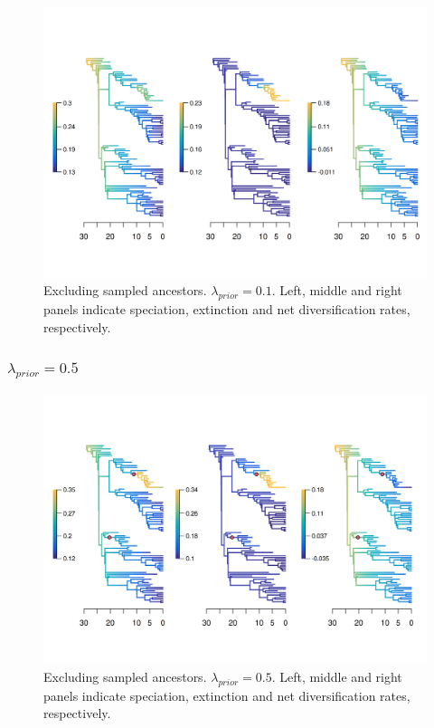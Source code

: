 \documentclass[a4paper, 12pt]{article}
\begin{document}
\begin{figure}[H]
  \centering
  \includegraphics[width = \linewidth]{figures/diversification/sensitivity-analyses/shifts-0-1/sensitivity-analysis-noanc-0-1.png}
  \caption{Excluding sampled ancestors. $\lambda_{prior} = 0.1$. Left, middle and right panels indicate speciation, extinction and net diversification rates, respectively.}
  \label{fig-noanc-0-1}
\end{figure}

\subsubsection{$\lambda_{prior} = 0.5$}

\begin{figure}[H]
  \centering
  \includegraphics[width = \linewidth]{figures/diversification/sensitivity-analyses/shifts-0-5/sensitivity-analysis-noanc-0-5.png}
  \caption{Excluding sampled ancestors. $\lambda_{prior} = 0.5$. Left, middle and right panels indicate speciation, extinction and net diversification rates, respectively.}
  \label{fig-noanc-0-5}
\end{figure}
\end{document}
